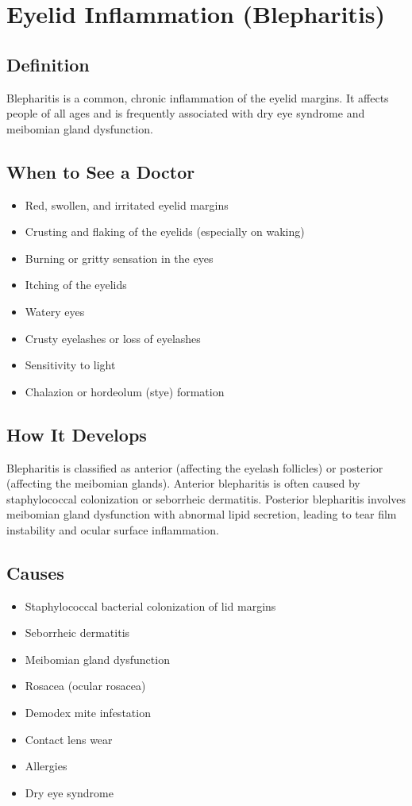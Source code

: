 \chapter{Eyelid Inflammation (Blepharitis)}

\section*{Definition}
Blepharitis is a common, chronic inflammation of the eyelid margins. It affects people of all ages and is frequently associated with dry eye syndrome and meibomian gland dysfunction.

\section*{When to See a Doctor}
\begin{itemize}
\item Red, swollen, and irritated eyelid margins
\item Crusting and flaking of the eyelids (especially on waking)
\item Burning or gritty sensation in the eyes
\item Itching of the eyelids
\item Watery eyes
\item Crusty eyelashes or loss of eyelashes
\item Sensitivity to light
\item Chalazion or hordeolum (stye) formation
\end{itemize}

\section*{How It Develops}
Blepharitis is classified as anterior (affecting the eyelash follicles) or posterior (affecting the meibomian glands). Anterior blepharitis is often caused by staphylococcal colonization or seborrheic dermatitis. Posterior blepharitis involves meibomian gland dysfunction with abnormal lipid secretion, leading to tear film instability and ocular surface inflammation.

\section*{Causes}
\begin{itemize}
\item Staphylococcal bacterial colonization of lid margins
\item Seborrheic dermatitis
\item Meibomian gland dysfunction
\item Rosacea (ocular rosacea)
\item Demodex mite infestation
\item Contact lens wear
\item Allergies
\item Dry eye syndrome
\end{itemize}


